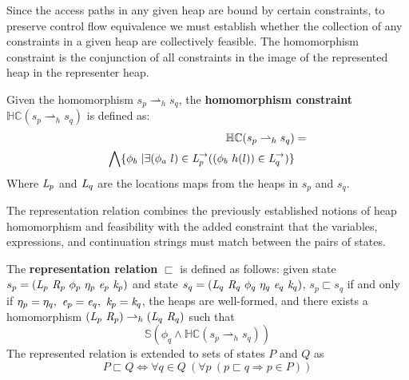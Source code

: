 Since the access paths in any given heap are bound by certain constraints, to preserve control flow equivalence we must establish whether the collection of any constraints in a given heap are collectively feasible. The homomorphism constraint is the conjunction of all constraints in the image of the represented heap in the representer heap.

\begin{definition}
\label{def:hc}
Given the homomorphism $s_p \rightharpoonup_{h} s_q$, the \textbf{homomorphism constraint} $\mathbb{HC}(s_p \rightharpoonup_{h} s_q)$ is defined as:
\begin{align*}
\mathbb{HC}(s_p \rightharpoonup_{h} s_q) &= \\
 \bigwedge \{ \phi_b\ | \exists (\phi_a\ l) \in \emph{L}_p^\rightarrow ( (\phi_b\ h(l)) \in \emph{L}_q^\rightarrow)\} 
\end{align*}
Where $\emph{L}_p$ and $\emph{L}_q$ are the locations maps from the heaps in $s_p$ and $s_q$.
\end{definition}

The representation relation combines the previously established
notions of heap homomorphism and feasibility with the added constraint
that the variables, expressions, and continuation strings must match
between the pairs of states.

\begin{definition}
\label{representation}
The \textbf{representation relation} $\sqsubset$ is defined as
follows: given state $s_p = (
\emph{L}_p\ \emph{R}_p\ \phi_p\ \eta_p\ \emph{e}_p\ \emph{k}_p )$
and state $s_q = (
\emph{L}_q\ \emph{R}_q\ \phi_q\ \eta_q\ \emph{e}_q\ \emph{k}_q )$,
$s_p \sqsubset s_q $ if and only if $\eta_p = \eta_q ,\ \emph{e}_p =
\emph{e}_q ,\ \emph{k}_p = \emph{k}_q$, the heaps are well-formed, and there exists a
homomorphism $(\emph{L}_p\ \emph{R}_p) \rightharpoonup_{h}
(\emph{L}_q\ \emph{R}_q)$ such that
\begin{equation}
\label{eqn:valid}
 \mathbb{S}( \phi_q \wedge \mathbb{HC}(s_p \rightharpoonup_{h} s_q) ) 
\end{equation}
The represented relation is extended to sets of states $P$ and $Q$ as
$$
P \sqsubset Q \Longleftrightarrow \forall q \in Q\ (\forall p\ (p \sqsubset q \Rightarrow p \in P))
$$
\end{definition}


